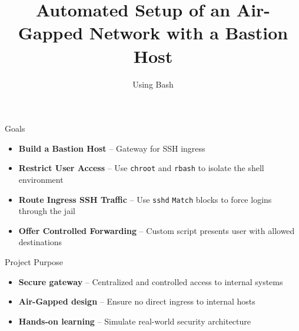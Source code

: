 \documentclass[14pt,compress,dvipsnames,aspectratio=169]{beamer} %
\title{\textbf{Automated Setup of an Air-Gapped Network with a Bastion Host}}
\author{Using Bash}
\date{}  %
\begin{document}

\begin{frame}[plain]
\titlepage
\end{frame}





\begin{frame}{Goals}
    \begin{itemize}
        \item{\textbf{Build a Bastion
            Host} -- Gateway for SSH ingress}

        \item{\textbf{Restrict User
            Access} -- Use \texttt{chroot} and \texttt{rbash} to isolate the shell
            environment}

        \item{\textbf{Route Ingress SSH
            Traffic} -- Use \texttt{sshd} \texttt{Match} blocks to force logins through the jail}

        \item{\textbf{Offer Controlled
            Forwarding}  -- Custom script presents user with allowed destinations}
    \end{itemize}
\end{frame}

\begin{frame}{Project Purpose}
    \begin{itemize}
        \item{\textbf{Secure gateway} -- Centralized and controlled access to internal systems} 
            \vspace{0.5cm}
        \item{\textbf{Air-Gapped design} -- Ensure no direct ingress to internal hosts}
            \vspace{0.5cm}
        \item{\textbf{Hands-on learning} -- Simulate real-world security architecture}
    \end{itemize}
\end{frame}
\end{document}
